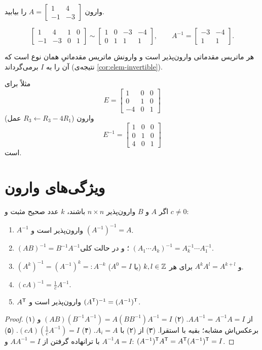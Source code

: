 \begin{example}
وارون $A=\begin{bmatrix}1&4\\-1&-3\end{bmatrix}$ را بیابید.
\end{example}
\begin{solution}
\[
\left[\begin{array}{cc|cc}1&4&1&0\\-1&-3&0&1\end{array}\right]\sim
\left[\begin{array}{cc|cc}1&0&-3&-4\\0&1&1&1\end{array}\right],
\qquad A^{-1}=\begin{bmatrix}-3&-4\\1&1\end{bmatrix}.
\]
\end{solution}

\begin{theorem}\label{thm:elem-inv}
هر ماتریس مقدماتی  وارون‌پذیر است و وارونش ماتریس مقدماتیِ همان نوع است که آن را به $I$ برمی‌گرداند (نتیجه‌ی \ref{cor:elem-invertible}).
\end{theorem}
مثلاً برای 
\[
E=\begin{bmatrix}1&0&0\\0&1&0\\-4&0&1\end{bmatrix}
\]
 (عمل $R_3\leftarrow R_3-4R_1$) وارون 
\[
E^{-1}=\begin{bmatrix}1&0&0\\0&1&0\\4&0&1\end{bmatrix}
\]
است.

\section{ویژگی‌های وارون}

\begin{theorem}\label{thm:inv-props}
اگر $A$ و $B$ وارون‌پذیر $n\times n$ باشند، $k$ عدد صحیح مثبت و $c\neq0$:
\begin{enumerate}
  \item $A^{-1}$ وارون‌پذیر است و $(A^{-1})^{-1}=A$.
  \item $(AB)^{-1}=B^{-1}A^{-1}$؛ و در حالت کلی $(A_1\cdots A_k)^{-1}=A_k^{-1}\cdots A_1^{-1}$.
  \item $(A^k)^{-1}=(A^{-1})^k=:A^{-k}$ و $A^kA^l=A^{k+l}$ برای هر $k,l\in\mathbb{Z}$ (با $A^0=I$).
  \item $(cA)^{-1}=\frac1cA^{-1}$.
  \item $A^{\mathsf{T}}$ وارون‌پذیر است و $(A^{\mathsf{T}})^{-1}=(A^{-1})^{\mathsf{T}}$.
\end{enumerate}
\end{theorem}
\begin{proof}
(۱) از $AA^{-1}=A^{-1}A=I$. (۲) $(AB)(B^{-1}A^{-1})=A(BB^{-1})A^{-1}=I$ و برعکس‌اش مشابه؛ بقیه با استقرا. (۳) از (۲) با $A_i=A$. (۴) $(cA)(\frac1cA^{-1})=I$. (۵) با ترانهاده گرفتن از $AA^{-1}=I$ و $A^{-1}A=I$: $(A^{-1})^{\mathsf{T}} A^{\mathsf{T}}=A^{\mathsf{T}}(A^{-1})^{\mathsf{T}}=I$.
\end{proof}

